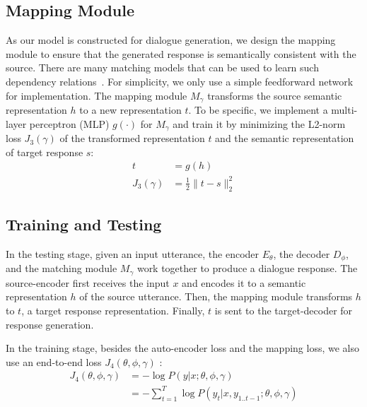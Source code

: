\documentclass[11pt,a4paper]{article}
\begin{document}
\begin{CJK}{UTF8}{song}
\subsection{Mapping Module}\label{mapping}
As our model is constructed for dialogue generation, we design the mapping module to ensure that the generated response is semantically consistent with the source. There are many matching models that can be used to learn such dependency relations~\cite{DBLP:conf/nips/HuLLC14,DBLP:conf/cikm/GuoFAC16,DBLP:conf/aaai/PangLGXWC16,chendeli18}. For simplicity, we only use a simple feedforward network for implementation.  The mapping module $M_{\gamma}$ transforms the source semantic representation $h$ to a new representation $t$. To be specific, we implement a multi-layer perceptron (MLP) $g(\cdot)$ for $M_{\gamma}$ and train it by minimizing the L2-norm loss $J_3(\gamma)$ of the transformed representation $t$ and the semantic representation of target response $s$:
\begin{equation}
\begin{split}
t &= g(h)\\
J_3(\gamma) &= \frac{1}{2}\|t-s\|_2^2
\end{split}
\end{equation}













\subsection{Training and Testing}
\label{training}
In the testing stage, given an input utterance, the encoder $E_\theta$, the decoder $D_\phi$, and the matching module $M_\gamma$ work together to produce a dialogue response.
The source-encoder first receives the input $x$ and encodes it to a semantic representation $h$ of the source utterance. Then, the mapping module transforms $h$ to $t$, a target response representation. Finally, $t$ is sent to the target-decoder for response generation.

In the training stage, besides the auto-encoder loss and the mapping loss, we also use an end-to-end loss $J_4(\theta, \phi, \gamma)$ :
\begin{align}
	J_4(\theta, \phi, \gamma) &= - \log P(y|x;\theta, \phi, \gamma) \\
    &= - \sum_{t=1}^T \log P(y_t|x,y_{1..t-1};\theta, \phi, \gamma)
\end{align}


\end{CJK}
\end{document}
